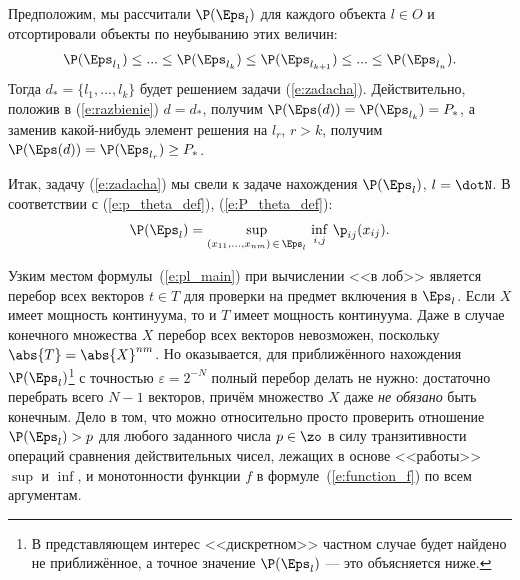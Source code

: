 Предположим, мы рассчитали  $\P(\Eps_l)$ для каждого объекта $l \in O$ и отсортировали объекты по неубыванию этих величин:
\begin{equation}
  \label{e:left_order}
  \P(\Eps_{l_1}) \leq ... \leq \P(\Eps_{l_k}) \leq \P(\Eps_{l_{k+1}}) \leq ... \leq \P(\Eps_{l_n}). 
\end{equation}
Тогда $d_* = \{l_1, ...,  l_k\}$ будет решением задачи (\ref{e:zadacha}). Действительно, положив в (\ref{e:razbienie}) $d = d_*$, получим $\P(\Eps(d)) = \P(\Eps_{l_k}) = P_*$, а заменив какой-нибудь элемент  решения на $l_r$, $r > k$, получим $\P(\Eps(d)) = \P(\Eps_{l_r}) \geq P_*$. 


 Итак, задачу (\ref{e:zadacha}) мы свели к задаче нахождения $\P(\Eps_l)$, $l = \dotN$. В соответствии с (\ref{e:p_theta_def}), (\ref{e:P_theta_def}):
\begin{equation}
  \label{e:pl_main}
  \P(\Eps_l) = \sup_{(x_{11}, ..., x_{nm})\,\in\,\Eps_l} \, \inf_{i, j}\,\p_{ij}(x_{ij}). 
\end{equation}

Узким местом формулы~(\ref{e:pl_main}) при вычислении <<в лоб>> является перебор всех векторов $t \in T$ для проверки на предмет включения в $\Eps_l$. Если $X$ имеет мощность континуума, то и $T$ имеет мощность континуума. Даже в случае конечного множества $X$ перебор всех векторов невозможен, поскольку $\abs{T} = \abs{X}^{nm}$. Но оказывается, для приближённого нахождения $\P(\Eps_l)$\footnote{В представляющем интерес <<дискретном>> частном случае будет найдено не приближённое, а точное значение $\P(\Eps_l)$ --- это объясняется ниже.} с точностью $\varepsilon = 2^{-N}$ полный перебор делать не нужно: достаточно перебрать всего $N-1$ векторов, причём множество $X$ даже {\sl не обязано} быть конечным. Дело в том, что можно относительно просто проверить отношение $\P(\Eps_l) > p$ для любого заданного числа $p \in \zo$ в силу транзитивности операций сравнения действительных чисел, лежащих в основе <<работы>>  $\sup$ и $\inf$, и монотонности функции $f$ в формуле~(\ref{e:function_f}) по всем аргументам. 

